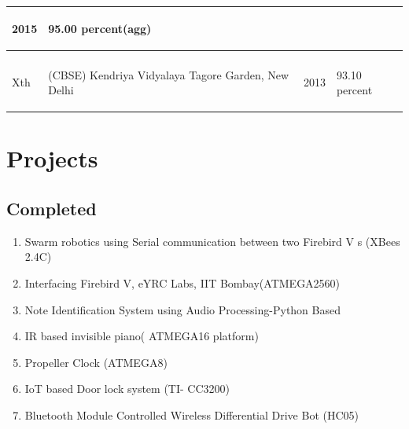 \documentclass[11pt]{article}
\begin{document}
\begin{minipage}{0.75\linewidth}
\begin{center}
\begin{tabular}{ |m{4cm}| m{4cm}| m{2cm}| m{3cm}| }
\begin{center}
2015
\end{center}&
\begin{center}
95.00 percent(agg)
\end{center}\\
\hline
\begin{center}
AISSE\\
Xth
\end{center}&
\begin{center}
(CBSE) Kendriya Vidyalaya Tagore Garden, New Delhi
\end{center}&
\begin{center}
2013
\end{center}&
\begin{center}
93.10 percent
\end{center}\\
\hline
\end{tabular}
\end{center}
\section{\color{orange}Pro\color{black}jects}
\subsection{Co\color{purple}m\color{black}pl\color{purple}e\color{black}ted}
\begin{enumerate}
\item Swarm robotics using Serial communication between two Firebird V s (XBees 2.4C)
\item Interfacing Firebird V, eYRC Labs, IIT Bombay(ATMEGA2560)
\item Note Identification System using Audio Processing-Python Based
\item IR based invisible piano( ATMEGA16 platform)
\item Propeller Clock  (ATMEGA8)
\item IoT based Door lock system (TI- CC3200)
\item Bluetooth Module Controlled Wireless Differential Drive Bot (HC05)
\end{enumerate}
\end{minipage}
\end{document}
